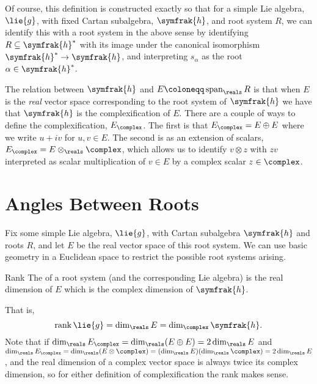 \documentclass[fleqn]{NotesClass}
\DeclareMathOperator{\Span}{span}
\newcommand{\csa}{\symfrak{h}}
\DeclareMathOperator{\rank}{rank}
\begin{document}
    Of course, this definition is constructed exactly so that for a simple Lie algebra, \(\lie{g}\), with fixed Cartan subalgebra, \(\csa\), and root system \(R\), we can identify this with a root system in the above sense by identifying \(R \subseteq \csa^*\) with its image under the canonical isomorphism \(\csa^* \to \csa\), and interpreting \(s_\alpha\) as the root \(\alpha \in \csa^*\).
    
    The relation between \(\csa\) and \(E \coloneqq \Span_{\reals} R\) is that when \(E\) is the \emph{real} vector space corresponding to the root system of \(\csa\) we have that \(\csa\) is the complexification of \(E\).
    There are a couple of ways to define the complexification, \(E_{\complex}\).
    The first is that \(E_{\complex} = E \oplus E\) where we write \(u + iv\) for \(u, v \in E\).
    The second is as an extension of scalars, \(E_{\complex} = E \otimes_{\reals} \complex\), which allows us to identify \(v \otimes z\) with \(zv\) interpreted as scalar multiplication of \(v \in E\) by a complex scalar \(z \in \complex\).
    
    \section{Angles Between Roots}
    Fix some simple Lie algebra, \(\lie{g}\), with Cartan subalgebra \(\csa\) and roots \(R\), and let \(E\) be the real vector space of this root system.
    We can use basic geometry in a Euclidean space to restrict the possible root systems arising.
    
    \begin{dfn}{Rank}{}
        The  of a root system (and the corresponding Lie algebra) is the real dimension of \(E\) which is the complex dimension of \(\csa\).
    \end{dfn}
    
    That is,
    \begin{equation}
        \rank \lie{g} = \dim_{\reals} E = \dim_{\complex} \csa.
    \end{equation}
    Note that if \(\dim_{\reals} E_{\complex} = \dim_{\reals}(E \oplus E) = 2 \dim_{\reals} E\) and \(\dim_{\reals} E_{\complex} = \dim_{\reals}(E \otimes \complex) = (\dim_{\reals} E)(\dim_{\reals} \complex) = 2 \dim_{\reals}E\), and the real dimension of a complex vector space is always twice its complex dimension, so for either definition of complexification the rank makes sense.
    
\end{document}
